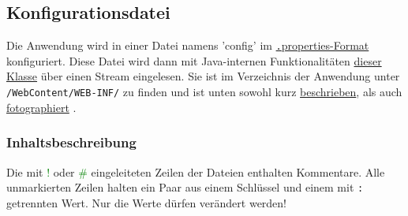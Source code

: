 \documentclass{article}
\begin{document}
\subsection{Konfigurationsdatei}
\indent Die Anwendung wird in einer Datei namens 'config' im \hyperlink{https://de.wikipedia.org/wiki/Java-Properties-Datei}{{\texttt.properties}-Format} konfiguriert. Diese Datei wird dann mit Java-internen Funktionalitäten \hyperlink{https://docs.oracle.com/javase/7/docs/api/java/util/Properties.html}{dieser Klasse} über einen Stream eingelesen. Sie ist im Verzeichnis der Anwendung unter \texttt{/WebContent/WEB-INF/} zu finden und ist unten sowohl kurz \hyperlink{configTabelle}{beschrieben}, als auch \hyperlink{configFoto}{fotographiert} .
\subsubsection{Inhaltsbeschreibung}
\hypertarget{propSchema}{}
Die mit \textcolor{green}{!} oder \textcolor{green}{\#} eingeleiteten Zeilen der Dateien enthalten Kommentare. Alle unmarkierten Zeilen halten ein Paar aus einem Schlüssel und einem mit \texttt{:} getrennten Wert. Nur die Werte dürfen verändert werden! 
\end{document}
